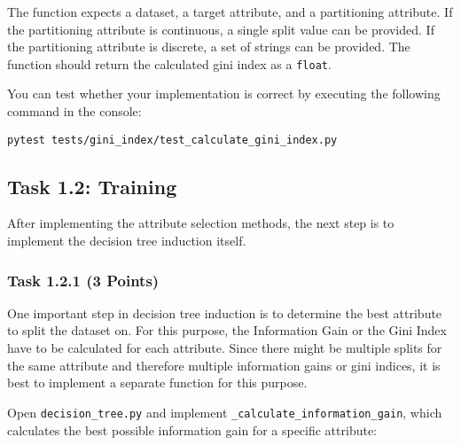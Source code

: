 \documentclass[
english,
smallborders
]{i6prcsht}
\newcommand{\points}[1]{\hfill \color{red}(#1 Points)\color{black}}
\begin{document}
\vspace*{0.5cm}

The function expects a dataset, a target attribute, and a partitioning attribute. If the partitioning attribute is continuous, a single split value can be provided. If the partitioning attribute is discrete, a set of strings can be provided. The function should return the calculated gini index as a \texttt{float}.

You can test whether your implementation is correct by executing the following command in the console:

\vspace*{0.3cm}

\begin{lstlisting}
pytest tests/gini_index/test_calculate_gini_index.py
\end{lstlisting}

\newpage

\subsection*{Task 1.2: Training}

After implementing the attribute selection methods, the next step is to implement the decision tree induction itself.

\subsubsection*{Task 1.2.1 \points{3}}

One important step in decision tree induction is to determine the best attribute to split the dataset on. For this purpose, the Information Gain or the Gini Index have to be calculated for each attribute. Since there might be multiple splits for the same attribute and therefore multiple information gains or gini indices, it is best to implement a separate function for this purpose.

Open \texttt{decision\_tree.py} and implement \texttt{\_calculate\_information\_gain}, which calculates the best possible information gain for a specific attribute:

\vspace*{0.3cm}
\end{document}
